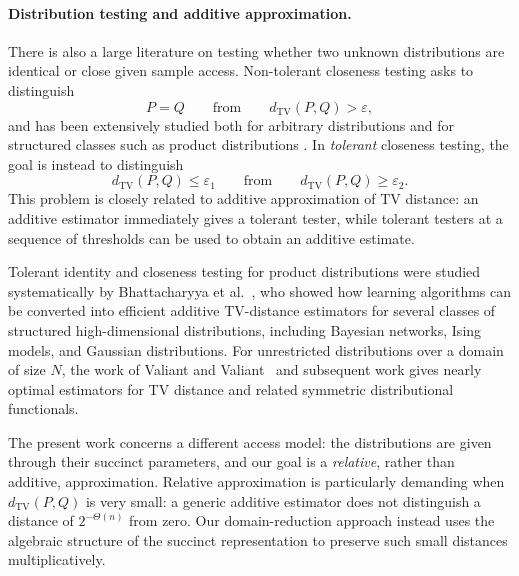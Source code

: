 \documentclass{article}
\begin{document}
\paragraph{Distribution testing and additive approximation.}
There is also a large literature on testing whether two unknown
distributions are identical or close given sample access. Non-tolerant
closeness testing asks to distinguish
\[
    P=Q
    \qquad\text{from}\qquad
    d_{\mathrm{TV}}(P,Q)>\varepsilon,
\]
and has been extensively studied both for arbitrary distributions and
for structured classes such as product distributions
\cite{canonne2020testing,daskalakis2017square}. In \emph{tolerant} closeness testing, the goal is
instead to distinguish
\[
    d_{\mathrm{TV}}(P,Q)\leq \varepsilon_1
    \qquad\text{from}\qquad
    d_{\mathrm{TV}}(P,Q)\geq \varepsilon_2.
\]
This problem is closely related to additive approximation of TV distance:
an additive estimator immediately gives a tolerant tester, while
tolerant testers at a sequence of thresholds can be used to obtain an
additive estimate.

Tolerant identity and closeness testing for product distributions were
studied systematically by Bhattacharyya et al.~\cite{bhattacharyya2020efficient},
who showed how learning
algorithms can be converted into efficient additive TV-distance
estimators for several classes of structured high-dimensional
distributions, including Bayesian networks, Ising models, and Gaussian
distributions. For unrestricted distributions over a domain of size
$N$, the work of Valiant and Valiant~\cite{valiant2011estimating,valiant2017automatic} and subsequent
work gives nearly optimal estimators for TV distance and related
symmetric distributional functionals.

The present work concerns a different access model: the distributions are
given through their succinct parameters, and our goal is a
\emph{relative}, rather than additive, approximation. Relative
approximation is particularly demanding when $d_{\mathrm{TV}}(P,Q)$ is
very small: a generic additive estimator does not distinguish a distance
of $2^{-\Theta(n)}$ from zero. Our domain-reduction approach instead uses
the algebraic structure of the succinct representation to preserve such
small distances multiplicatively. 
\end{document}

